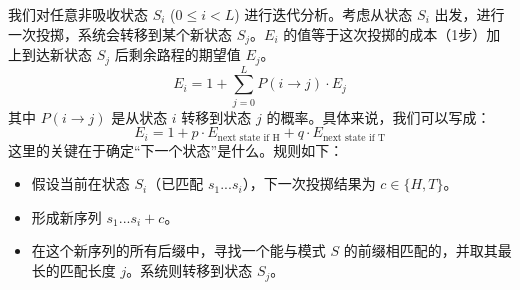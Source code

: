 \documentclass[UTF8]{ctexart}
\begin{document}
我们对任意非吸收状态 $S_i$ ($0 \le i < L$) 进行迭代分析。考虑从状态 $S_i$ 出发，进行一次投掷，系统会转移到某个新状态 $S_j$。$E_i$ 的值等于这次投掷的成本（1步）加上到达新状态 $S_j$ 后剩余路程的期望值 $E_j$。
$$ E_i = 1 + \sum_{j=0}^{L} P(i \to j) \cdot E_j $$
其中 $P(i \to j)$ 是从状态 $i$ 转移到状态 $j$ 的概率。具体来说，我们可以写成：
$$ E_i = 1 + p \cdot E_{\text{next state if H}} + q \cdot E_{\text{next state if T}} $$
这里的关键在于确定“下一个状态”是什么。规则如下：
\begin{itemize}
    \item 假设当前在状态 $S_i$（已匹配 $s_1...s_i$），下一次投掷结果为 $c \in \{H, T\}$。
    \item 形成新序列 $s_1...s_i + c$。
    \item 在这个新序列的所有后缀中，寻找一个能与模式 $S$ 的前缀相匹配的，并取其最长的匹配长度 $j$。系统则转移到状态 $S_j$。
\end{itemize}

\iffalse
\end{document}
